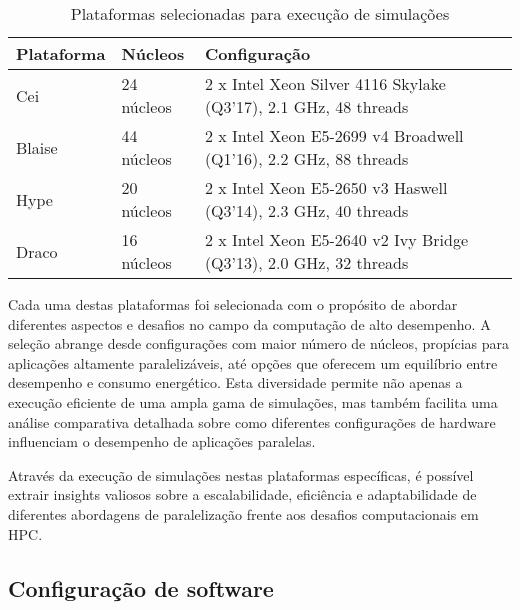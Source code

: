 \documentclass[ppgc,diss]{iiufrgs}
\begin{document}
\begin{table}[h]
	\caption{Plataformas selecionadas para execução de simulações}
	\begin{center}
		\begin{tabular}{l|l|l}
			\textbf{Plataforma} & \textbf{Núcleos} & \textbf{Configuração} \\
			\hline
			\hline
			Cei & 24 núcleos & 2 x Intel Xeon Silver 4116 Skylake (Q3'17), 2.1 GHz, 48 threads \\
			\hline
			Blaise & 44 núcleos & 2 x Intel Xeon E5-2699 v4 Broadwell (Q1'16), 2.2 GHz, 88 threads \\
			\hline
			Hype & 20 núcleos & 2 x Intel Xeon E5-2650 v3 Haswell (Q3'14), 2.3 GHz, 40 threads \\
			\hline
			Draco & 16 núcleos & 2 x Intel Xeon E5-2640 v2 Ivy Bridge (Q3'13), 2.0 GHz, 32 threads \\
			\hline
		\end{tabular}
	\end{center}
	\label{tbl:plataformas_simulacao}
\end{table}

Cada uma destas plataformas foi selecionada com o propósito de abordar diferentes aspectos e desafios no campo da computação de alto desempenho. A seleção abrange desde configurações com maior número de núcleos, propícias para aplicações altamente paralelizáveis, até opções que oferecem um equilíbrio entre desempenho e consumo energético. Esta diversidade permite não apenas a execução eficiente de uma ampla gama de simulações, mas também facilita uma análise comparativa detalhada sobre como diferentes configurações de hardware influenciam o desempenho de aplicações paralelas.

Através da execução de simulações nestas plataformas específicas, é possível extrair insights valiosos sobre a escalabilidade, eficiência e adaptabilidade de diferentes abordagens de paralelização frente aos desafios computacionais em HPC.
\subsection{Configuração de software}
\end{document}
